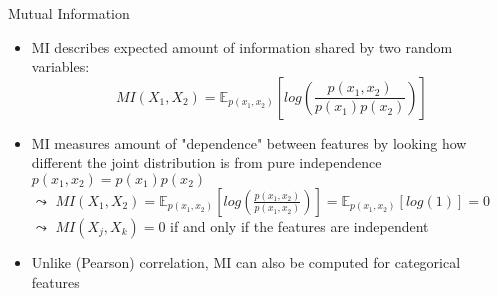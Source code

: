 \documentclass[11pt,compress,t,notes=noshow, aspectratio=169, xcolor=table]{beamer}
\begin{document}
\begin{frame}{Mutual Information}
    \begin{itemize}
        \item MI describes expected amount of information shared by two random variables:%
        $$MI(X_1, X_2 ) =  \mathbb{E}_{p(x_1, x_2)} \left[ log\left(\frac{p(x_1, x_2)}{p(x_1) p(x_2)} \right) \right] $$
        \item MI measures amount of "dependence" between features by looking how different the joint distribution is from pure independence $p(x_1, x_2) = p(x_1) p(x_2)$\\
        $\leadsto$ $MI(X_1, X_2) = \mathbb{E}_{p(x_1, x_2)} \left[ log\left(\frac{p(x_1, x_2)}{p(x_1, x_2)} \right) \right] = \mathbb{E}_{p(x_1, x_2)} \left[ log(1) \right] = 0$\\
        $\leadsto$  $MI(X_j, X_k) = 0$ if and only if the features are independent
        \item Unlike (Pearson) correlation, MI can also be computed for categorical features %
    \end{itemize}
\end{frame}
\end{document}
